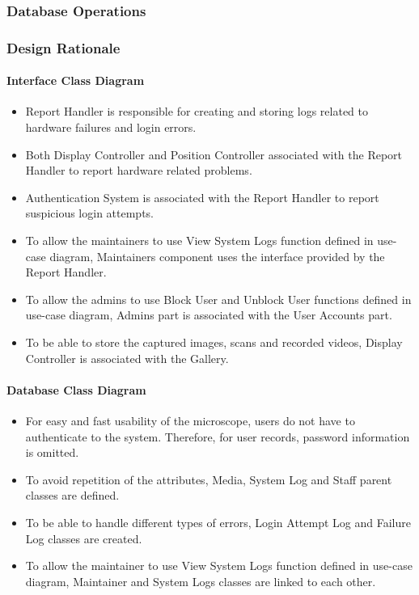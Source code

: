\subsubsection{Database Operations}


\subsubsection{Design Rationale}
\paragraph{Interface Class Diagram}
\begin{itemize}
	\item Report Handler is responsible for creating and storing logs related to hardware failures and login errors.
	\item Both Display Controller and Position Controller associated with the Report Handler to report hardware related problems.
	\item Authentication System is associated with the Report Handler to report suspicious login attempts.
	\item To allow the maintainers to use View System Logs function defined in use-case diagram, Maintainers component uses the interface provided by the Report Handler.
	\item To allow the admins to use Block User and Unblock User functions defined in use-case diagram, Admins part is associated with the User Accounts part.
	\item To be able to store the captured images, scans and recorded videos, Display Controller is associated with the Gallery.
\end{itemize}
\paragraph{Database Class Diagram}
\begin{itemize}
	\item For easy and fast usability of the microscope, users do not have to authenticate to the system. Therefore, for user records, password information is omitted.
	\item To avoid repetition of the attributes, Media, System Log and Staff parent classes are defined. 
	\item To be able to handle different types of errors, Login Attempt Log and Failure Log classes are created.
	\item To allow the maintainer to use View System Logs function defined in use-case diagram, Maintainer and System Logs classes are linked to each other.
\end{itemize}